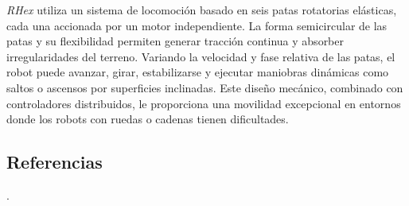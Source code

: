 \textit{RHex} utiliza un sistema de locomoción basado en seis patas rotatorias elásticas, 
cada una accionada por un motor independiente. La forma semicircular de las patas y su 
flexibilidad permiten generar tracción continua y absorber irregularidades del terreno. 
Variando la velocidad y fase relativa de las patas, el robot puede avanzar, girar, estabilizarse 
y ejecutar maniobras dinámicas como saltos o ascensos por superficies inclinadas. Este diseño 
mecánico, combinado con controladores distribuidos, le proporciona una movilidad excepcional 
en entornos donde los robots con ruedas o cadenas tienen dificultades. \\

\subsection*{Referencias}
\cite{doi:10.1177/02783640122067570} .